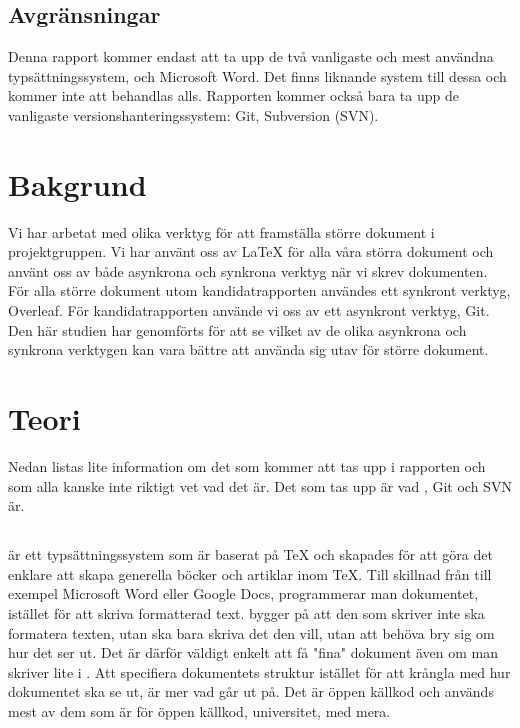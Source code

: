 \subsection{Avgränsningar}
Denna rapport kommer endast att ta upp de två vanligaste och mest användna typsättningssystem, \latex och Microsoft Word. Det finns liknande system till dessa och kommer inte att behandlas alls. Rapporten kommer också bara ta upp de vanligaste versionshanteringssystem: Git, Subversion (SVN).

\section{Bakgrund}
\label{sec:background-tuhkala}
Vi har arbetat med olika verktyg för att framställa större dokument i projektgruppen. Vi har använt oss av LaTeX för alla våra störra dokument och använt oss av både asynkrona och synkrona verktyg när vi skrev dokumenten. För alla större dokument utom kandidatrapporten användes ett synkront verktyg, Overleaf. För kandidatrapporten använde vi oss av ett asynkront verktyg, Git. Den här studien har genomförts för att se vilket av de olika asynkrona och synkrona verktygen kan vara bättre att använda sig utav för större dokument. 

\section{Teori}
\label{sec:theory-tuhkala}
Nedan listas lite information om det som kommer att tas upp i rapporten och som alla kanske inte riktigt vet vad det är. Det som tas upp är vad \latex, Git och SVN är.

\subsection{\latex}
\latex är ett typsättningssystem som är baserat på TeX och skapades för att göra det enklare att skapa generella böcker och artiklar inom TeX. Till skillnad från till exempel Microsoft Word eller Google Docs, programmerar man dokumentet, istället för att skriva formatterad text. \latex bygger på att den som skriver inte ska formatera texten, utan ska bara skriva det den vill, utan att behöva bry sig om hur det ser ut.  Det är därför väldigt enkelt att få "fina" dokument även om man skriver lite i \latex. Att specifiera dokumentets struktur istället för att krångla med hur dokumentet ska se ut, är mer vad \latex går ut på. Det är öppen källkod och används mest av dem som är för öppen källkod, universitet, med mera.

